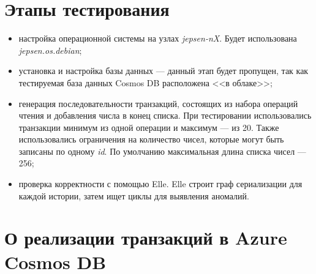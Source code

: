 \documentclass[14pt,  openany]{book}
\begin{document}
\section{Этапы тестирования}
 \begin{itemize}
 	\item настройка операционной системы на узлах \textit{jepsen-nX}. Будет использована \textit{jepsen.os.debian};
 	\item установка и настройка базы данных --- данный этап будет пропущен, так как тестируемая база данных Cosmos DB расположена <<в облаке>>;
 	\item генерация последовательности транзакций, состоящих из набора операций чтения и добавления числа в конец списка. При тестировании использовались транзакции минимум из одной операции и максимум --- из 20. Также использовались ограничения на количество чисел, которые могут быть записаны по одному \textit{id}. По умолчанию максимальная длина списка чисел --- 256;
 	\item проверка корректности с помощью Elle.  Elle строит граф сериализации для каждой истории, затем ищет циклы для выявления аномалий. 	
 \end{itemize}

\section{О реализации транзакций в Azure Cosmos DB}
\end{document}
